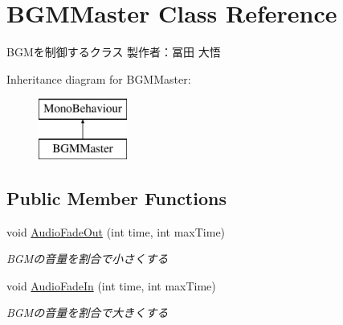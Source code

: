 \hypertarget{class_b_g_m_master}{}\section{B\+G\+M\+Master Class Reference}
\label{class_b_g_m_master}


B\+G\+Mを制御するクラス 製作者：冨田 大悟  


Inheritance diagram for B\+G\+M\+Master\+:\begin{figure}[H]
\begin{center}
\leavevmode
\includegraphics[height=2.000000cm]{class_b_g_m_master}
\end{center}
\end{figure}
\subsection*{Public Member Functions}
\begin{DoxyCompactItemize}
\item 
void \hyperlink{class_b_g_m_master_a5f4ad48af3ae8c81032d12d2e9dbc088}{Audio\+Fade\+Out} (int time, int max\+Time)
\begin{DoxyCompactList}\small\item\em B\+G\+Mの音量を割合で小さくする \end{DoxyCompactList}\item 
void \hyperlink{class_b_g_m_master_a4b2315419cfa6ea99960e554e195f209}{Audio\+Fade\+In} (int time, int max\+Time)
\begin{DoxyCompactList}\small\item\em B\+G\+Mの音量を割合で大きくする \end{DoxyCompactList}\end{DoxyCompactItemize}
